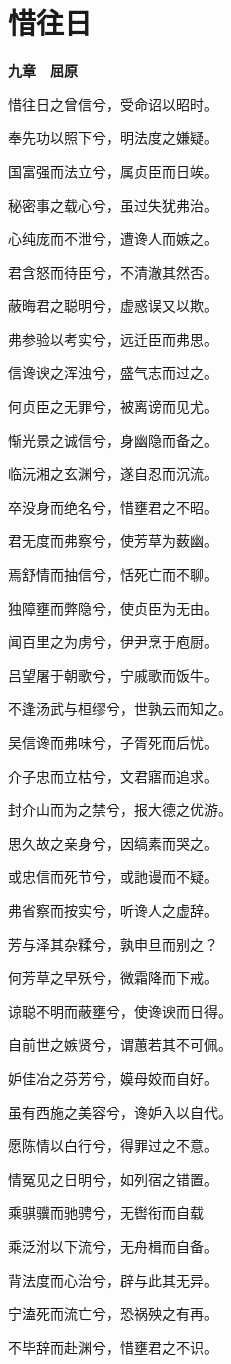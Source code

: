 \documentclass[12pt,a4paper]{ctexbook}
\begin{document}
\section{惜往日}
\textbf{九章　屈原}\par\vspace{0.5em}
惜往日之曾信兮，受命诏以昭时。\par
奉先功以照下兮，明法度之嫌疑。\par
国富强而法立兮，属贞臣而日竢。\par
秘密事之载心兮，虽过失犹弗治。\par
心纯庞而不泄兮，遭谗人而嫉之。\par
君含怒而待臣兮，不清澈其然否。\par
蔽晦君之聪明兮，虚惑误又以欺。\par
弗参验以考实兮，远迁臣而弗思。\par
信谗谀之浑浊兮，盛气志而过之。\par
何贞臣之无罪兮，被离谤而见尤。\par
惭光景之诚信兮，身幽隐而备之。\par
临沅湘之玄渊兮，遂自忍而沉流。\par
卒没身而绝名兮，惜壅君之不昭。\par
君无度而弗察兮，使芳草为薮幽。\par
焉舒情而抽信兮，恬死亡而不聊。\par
独障壅而弊隐兮，使贞臣为无由。\par
闻百里之为虏兮，伊尹烹于庖厨。\par
吕望屠于朝歌兮，宁戚歌而饭牛。\par
不逢汤武与桓缪兮，世孰云而知之。\par
吴信谗而弗味兮，子胥死而后忧。\par
介子忠而立枯兮，文君寤而追求。\par
封介山而为之禁兮，报大德之优游。\par
思久故之亲身兮，因缟素而哭之。\par
或忠信而死节兮，或訑谩而不疑。\par
弗省察而按实兮，听谗人之虚辞。\par
芳与泽其杂糅兮，孰申旦而别之？\par
何芳草之早殀兮，微霜降而下戒。\par
谅聪不明而蔽壅兮，使谗谀而日得。\par
自前世之嫉贤兮，谓蕙若其不可佩。\par
妒佳冶之芬芳兮，嫫母姣而自好。\par
虽有西施之美容兮，谗妒入以自代。\par
愿陈情以白行兮，得罪过之不意。\par
情冤见之日明兮，如列宿之错置。\par
乘骐骥而驰骋兮，无辔衔而自载\par
乘泛泭以下流兮，无舟楫而自备。\par
背法度而心治兮，辟与此其无异。\par
宁溘死而流亡兮，恐祸殃之有再。\par
不毕辞而赴渊兮，惜壅君之不识。\par
\end{document}
